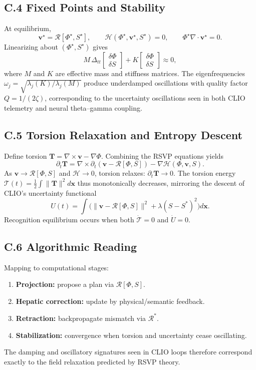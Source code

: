 \documentclass[11pt]{article}
\begin{document}
\subsection*{C.4 Fixed Points and Stability}
At equilibrium,
\[
\mathbf{v}^\star=\mathcal{R}[\Phi^\star,S^\star],
\qquad
\mathcal{H}(\Phi^\star,\mathbf{v}^\star,S^\star)=0,
\qquad
\Phi^\star\nabla\!\cdot\!\mathbf{v}^\star=0.
\]
Linearizing about $(\Phi^\star,S^\star)$ gives
\[
M\,\Delta_{tt}
  \!\begin{bmatrix}\delta\Phi\\ \delta S\end{bmatrix}
 +K
  \!\begin{bmatrix}\delta\Phi\\ \delta S\end{bmatrix}
 \approx 0,
\]
where $M$ and $K$ are effective mass and stiffness matrices.
The eigenfrequencies
$\omega_j=\sqrt{\lambda_j(K)/\lambda_j(M)}$
produce underdamped oscillations with quality factor
$Q=1/(2\zeta)$, corresponding to the uncertainty oscillations
seen in both CLIO telemetry and neural theta–gamma coupling.

\subsection*{C.5 Torsion Relaxation and Entropy Descent}
Define torsion
$\mathbf{T}=\nabla\times\mathbf{v}-\nabla\Phi$.  
Combining the RSVP equations yields
\[
\partial_t \mathbf{T}
 = \nabla\times\partial_t(\mathbf{v}-\mathcal{R}[\Phi,S])
 - \nabla\mathcal{H}(\Phi,\mathbf{v},S).
\]
As $\mathbf{v}\!\to\!\mathcal{R}[\Phi,S]$ and
$\mathcal{H}\!\to\!0$, torsion relaxes:
$\partial_t\mathbf{T}\!\to\!0$.
The torsion energy
$\mathcal{T}(t)
 = \tfrac{1}{2}\!\int\!\|\mathbf{T}\|^{2}d\mathbf{x}$
thus monotonically decreases,
mirroring the descent of CLIO’s uncertainty functional
\[
U(t)=\!\int\!\big(\|\mathbf{v}-\mathcal{R}[\Phi,S]\|^2
+\lambda(S-S^\ast)^2\big)d\mathbf{x}.
\]
Recognition equilibrium occurs when both
$\dot{\mathcal{T}}=0$ and $\dot{U}=0$.

\subsection*{C.6 Algorithmic Reading}
Mapping to computational stages:
\begin{enumerate}[label=\arabic*.,leftmargin=1.2em]
\item \textbf{Projection:} propose a plan via $\mathcal{R}[\Phi,S]$.
\item \textbf{Hepatic correction:} update by physical/semantic feedback.
\item \textbf{Retraction:} backpropagate mismatch via $\mathcal{R}^\ast$.
\item \textbf{Stabilization:} convergence when torsion and uncertainty cease oscillating.
\end{enumerate}
The damping and oscillatory signatures seen in CLIO loops therefore correspond
exactly to the field relaxation predicted by RSVP theory.
\end{document}
